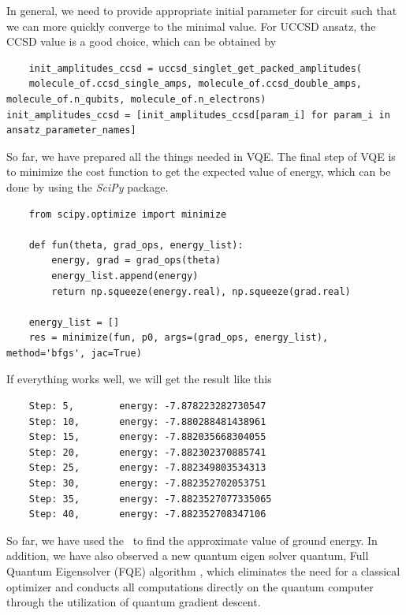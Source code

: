 In general, we need to provide appropriate initial parameter for circuit such that we can more quickly converge to the minimal value. For UCCSD ansatz, the CCSD value is a good choice, which can be obtained by
\begin{lstlisting}
    init_amplitudes_ccsd = uccsd_singlet_get_packed_amplitudes(
    molecule_of.ccsd_single_amps, molecule_of.ccsd_double_amps, molecule_of.n_qubits, molecule_of.n_electrons)
init_amplitudes_ccsd = [init_amplitudes_ccsd[param_i] for param_i in ansatz_parameter_names]
\end{lstlisting}
So far, we have prepared all the things needed in VQE.
The final step of VQE is to minimize the cost function to get the expected value of energy, which can be done by using the \textit{SciPy} package.
\begin{lstlisting}
    from scipy.optimize import minimize

    def fun(theta, grad_ops, energy_list):
        energy, grad = grad_ops(theta)
        energy_list.append(energy)
        return np.squeeze(energy.real), np.squeeze(grad.real)

    energy_list = []
    res = minimize(fun, p0, args=(grad_ops, energy_list), method='bfgs', jac=True)
\end{lstlisting}
If everything works well, we will get the result like this
\begin{lstlisting}
    Step: 5,        energy: -7.878223282730547
    Step: 10,       energy: -7.880288481438961
    Step: 15,       energy: -7.882035668304055
    Step: 20,       energy: -7.882302370885741
    Step: 25,       energy: -7.882349803534313
    Step: 30,       energy: -7.882352702053751
    Step: 35,       energy: -7.8823527077335065
    Step: 40,       energy: -7.882352708347106
\end{lstlisting}
So far, we have used the \MindQuantum\ to find the approximate value of ground energy. In addition, we have also observed a new quantum eigen solver quantum, Full Quantum Eigensolver (FQE) algorithm \cite{wei2020full}, which eliminates the need for a classical optimizer and conducts all computations directly on the quantum computer through the utilization of quantum gradient descent.
